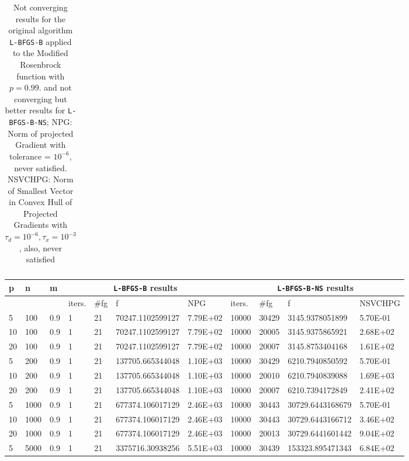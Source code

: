 \begin{table}
\begin{center}
\begin{tabular}{|l|l|l|l|l|l|l|l|l|l|l|}
      \hline
    \end{tabular}
    \caption[A value where \texttt{L-BFGS-B-NS} is supposed to fail. $p = 0.99$]{Not converging results for the original algorithm \texttt{L-BFGS-B} applied to the Modified Rosenbrock function with $p = 0.99$.  and not converging but better results for \texttt{L-BFGS-B-NS}; NPG: Norm of projected Gradient with tolerance = $10^{-6}$, never satisfied. NSVCHPG: Norm of Smallest Vector in Convex Hull of Projected Gradients with $\tau_d = 10^{-6}, \tau_x = 10^{-3}$, also, never satisfied}
    \label{p099}
  \end{center}
\end{table}


\begin{table}
  \tiny
  \begin{center}
    \begin{tabular}{|l|l|l|l|l|l|l|l|l|l|l|}
      \hline
      p  & n & m  & \multicolumn{4}{|c|}{\texttt{L-BFGS-B} results} & \multicolumn{4}{|c|}{\texttt{L-BFGS-B-NS} results} \\ \hline
      &  &  & iters. & \#fg & f & NPG & iters. & \#fg & f & NSVCHPG \\ \hline
      5 & 100 & 0.9 & 1 & 21 & 70247.1102599127 & 7.79E+02 & 10000 & 30429 & 3145.9378051899 & 5.70E-01\\
      10 & 100 & 0.9 & 1 & 21 & 70247.1102599127 & 7.79E+02 & 10000 & 20005 & 3145.9375865921 & 2.68E+02\\
      20 & 100 & 0.9 & 1 & 21 & 70247.1102599127 & 7.79E+02 & 10000 & 20007 & 3145.8753404168 & 1.61E+02\\
      5 & 200 & 0.9 & 1 & 21 & 137705.665344048 & 1.10E+03 & 10000 & 30429 & 6210.7940850592 & 5.70E-01\\
      10 & 200 & 0.9 & 1 & 21 & 137705.665344048 & 1.10E+03 & 10000 & 20010 & 6210.7940839088 & 1.69E+03\\
      20 & 200 & 0.9 & 1 & 21 & 137705.665344048 & 1.10E+03 & 10000 & 20007 & 6210.7394172849 & 2.41E+02\\
      5 & 1000 & 0.9 & 1 & 21 & 677374.106017129 & 2.46E+03 & 10000 & 30443 & 30729.6443168679 & 5.70E-01\\
      10 & 1000 & 0.9 & 1 & 21 & 677374.106017129 & 2.46E+03 & 10000 & 30443 & 30729.6443166712 & 3.46E+02\\
      20 & 1000 & 0.9 & 1 & 21 & 677374.106017129 & 2.46E+03 & 10000 & 20013 & 30729.6441601442 & 9.04E+02\\
      5 & 5000 & 0.9 & 1 & 21 & 3375716.30938256 & 5.51E+03 & 10000 & 30439 & 153323.895471343 & 6.84E+02\\

\end{tabular}
\end{center}
\end{table}
